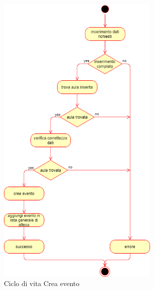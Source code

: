 \documentclass[11pt]{article}
\begin{document}
\begin{figure}[H]
\centering
\includegraphics[width=0.7\textwidth]{Ciclo di vita Crea evento.png}
\caption{Ciclo di vita Crea evento}
\end{figure}
\end{document}

